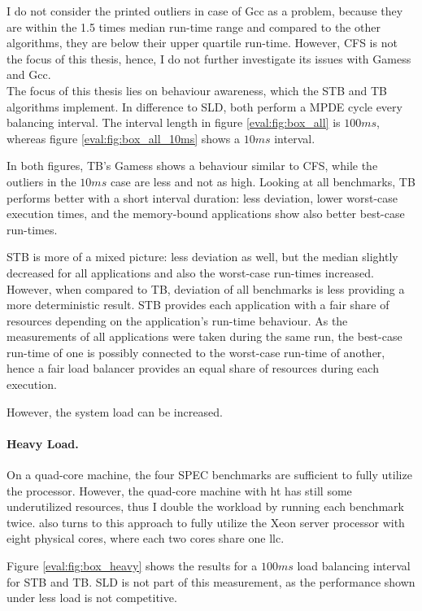 I do not consider the printed outliers in case of Gcc as a problem, because
they are within the 1.5 times median run-time range and compared to the other
algorithms, they are below their upper quartile run-time.
However, CFS is not the focus of this thesis, hence, I do not further
investigate its issues with Gamess and Gcc.
\\

The focus of this thesis lies on behaviour awareness, which the STB and TB
algorithms implement.
In difference to SLD, both perform a MPDE cycle every balancing interval.
The interval length in figure \ref{eval:fig:box_all} is $100ms$, whereas figure
\ref{eval:fig:box_all_10ms} shows a $10ms$ interval.

In both figures, TB's Gamess shows a behaviour similar to CFS, while the
outliers in the $10ms$ case are less and not as high.
Looking at all benchmarks, TB performs better with a short interval duration:
less deviation, lower worst-case execution times, and the memory-bound
applications show also better best-case run-times.

STB is more of a mixed picture: less deviation as well, but the median
slightly decreased for all applications and also the worst-case run-times
increased.
However, when compared to TB, deviation of all benchmarks is less providing a
more deterministic result.
STB provides each application with a fair share of resources depending on the
application's run-time behaviour.
As the measurements of all applications were taken during the same run, the
best-case run-time of one is possibly connected to the worst-case run-time of
another, hence a fair load balancer provides an equal share of resources
during each execution.

However, the system load can be increased.


\paragraph{Heavy Load.}
On a quad-core machine, the four SPEC benchmarks are sufficient to fully
utilize the processor.
However, the quad-core machine with \gls{ht} has still some underutilized
resources, thus I double the workload by running each benchmark twice.
\cite{zhuravlev_addressing_2010} also turns to this approach to fully utilize
the Xeon server processor with eight physical cores, where each two cores share
one \gls{llc}.

Figure \ref{eval:fig:box_heavy} shows the results for a $100ms$ load balancing
interval for STB and TB. SLD is not part of this measurement, as the
performance shown under less load is not competitive.

